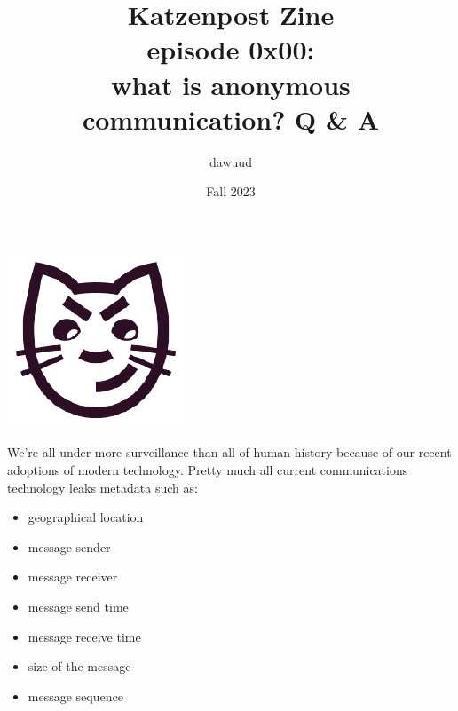 \documentclass[statementpaper,oneside,article,14pt]{memoir}
\newcommand{\BackgroundPic}[1]{%
\put(0,0){%
\parbox[b][\paperheight]{\paperwidth}{%
\vfill
\centering
{\transparent{0.4} \texttt{[image: \#1]}}%
\vfill
}}}
\begin{document}

\title{Katzenpost Zine \\
  episode 0x00: \\
  what is anonymous communication? Q \& A }
\author{dawuud}
\date{Fall 2023}

\begingroup
\let\cleardoublepage\clearpage


\begin{titlingpage}
\maketitle

\begin{center}
  \includegraphics[scale=.2]{katzenpost_logo} \\
\end{center}

\end{titlingpage}

\endgroup

\pagestyle{empty}



We're all under more surveillance than all of human history
because of our recent adoptions of modern technology.
Pretty much all current communications technology leaks metadata
such as:

\begin{itemize}
\item geographical location
\item message sender
\item message receiver
\item message send time
\item message receive time
\item size of the message
\item message sequence
\end{itemize}
\end{document}
